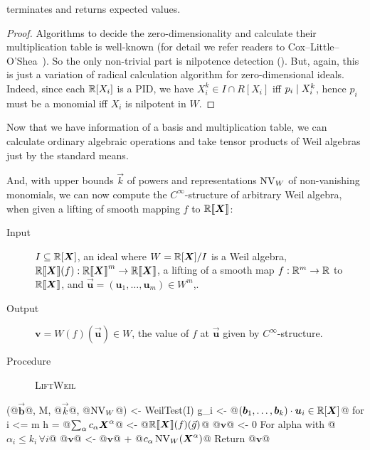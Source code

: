 \documentclass[%
  sigconf,authorversion,screen]{acmart}
\begin{document}
\begin{theorem}
   terminates and returns expected values.
\end{theorem}
\begin{proof}
  Algorithms to decide the zero-dimensionality and calculate their multiplication table is well-known (for detail we refer readers to Cox--Little--O'Shea~\cite[Chapter 2]{CLO:2005}).
  So the only non-trivial part is nilpotence detection ().
  But, again, this is just a variation of radical calculation algorithm for zero-dimensional ideals.
  Indeed, since each $\mathbb{R}[X_i]$ is a PID, we have $X_i^k \in I \cap R[X_i]$ iff $p_i \mathrel{\mid} X_i^k$, hence $p_i$ must be a monomial iff $X_i$ is nilpotent in $W$.
\end{proof}
Now that we have information of a basis and multiplication table, we can calculate ordinary algebraic operations and take tensor products of Weil algebras just by the standard means.

And, with upper bounds $\vec k$ of powers and representations $\operatorname{NV}_W$ of non-vanishing monomials, we can now compute the $C^\infty$-structure of arbitrary Weil algebra, when given a lifting of smooth mapping $f$ to $\mathord{\mathbb{R}\llbracket\boldsymbol{X}\rrbracket}$:

\begin{algorithm}\label{alg:smooth-weil}
  \hfill\vspace{-.25em}
  \begin{description}
    \item[Input]
      $I \subseteq \mathbb{R}[\boldsymbol{X}]$, an ideal where $W = \mathbb{R}[\boldsymbol{X}]/I$ is a Weil algebra,
      $\mathbb{R} \llbracket\boldsymbol{X}\rrbracket(f): \mathord{\mathbb{R}\llbracket\boldsymbol{X}\rrbracket}^m \to \mathord{\mathbb{R}\llbracket\boldsymbol{X}\rrbracket}$, a lifting of a smooth map $f: \mathbb{R}^m \to \mathbb{R}$ to $\mathord{\mathbb{R}\llbracket\boldsymbol{X}\rrbracket}$, and $\vec{\boldsymbol{u}} = (\boldsymbol{u}_1, \dots, \boldsymbol{u}_m) \in W^m$,.
    \item[Output] $\boldsymbol{v} = W(f)(\vec{\boldsymbol u}) \in W$, the value of $f$ at $\vec{\boldsymbol{u}}$ given by $C^\infty$-structure.
    \item[Procedure] \textup{\textsc{LiftWeil}}
  \end{description}
\begin{alg}
(@$\vec{\boldsymbol{b}}$@, M, @$\vec{k}$@, @$\operatorname{NV}_W$@) <- WeilTest(I)
g_i <- @$(\boldsymbol{b}_1, \dots, \boldsymbol{b}_k) \cdot \boldsymbol{u}_i \in \mathbb{R}[\boldsymbol{X}]$@ for i <= m
h = @$\sum_\alpha c_\alpha \boldsymbol{X}^\alpha$@ <- @$\mathord{\mathbb{R}\llbracket\boldsymbol{X}\rrbracket}(f)(\vec{g})$@
@$\boldsymbol v$@ <- 0
For alpha with @$\alpha_i \leq k_i\, \forall i$@
  @$\boldsymbol{v}$@ <- @$\boldsymbol v$@ + @$c_\alpha \operatorname{NV}_W(\boldsymbol{X}^\alpha)$@
Return @$\boldsymbol{v}$@
\end{alg}
\end{algorithm}
\end{document}
